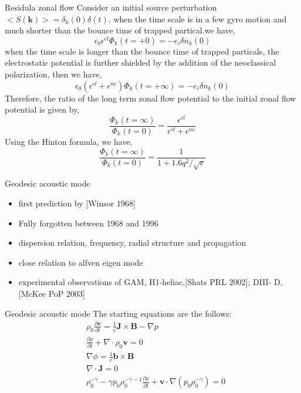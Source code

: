 \documentclass{beamer}
\begin{document}
\begin{frame}{Residula zonal flow}
Consider an initial source perturbation $<S(\pmb{k})>=\delta_k(0)\delta(t)$. when the time scale is in a few gyro motion and much shorter than the bounce time of trapped partical.we have,
\begin{equation}
\epsilon_0\epsilon^{cl}\Phi_k(t=+0)=-e_i\delta{n_k(0)}
\end{equation} 
when the time scale is longer than the bounce time of trapped particals, the electrostatic potential is further shielded by the addition of the neoclassical polarization, then we have,
\begin{equation}
\epsilon_0(\epsilon^{cl}+\epsilon^{nc})\Phi_k(t=+\infty)=-e_i\delta{n_k(0)}
\end{equation}
Therefore, the ratio of the long term zonal flow potential to the initial zonal flow potential is given by, 
\begin{equation}
\frac{\Phi_k(t=\infty)}{\Phi_k(t=0)}=\frac{\epsilon^{cl}}{\epsilon^{cl}+\epsilon^{nc}}
\end{equation}
Using the Hinton formula, we have,
\begin{equation}
\frac{\Phi_k(t=\infty)}{\Phi_k(t=0)}=\frac{1}{1+1.6q^2/\sqrt{\epsilon}}
\end{equation}
\end{frame}


\begin{frame}{Geodesic acoustic mode}
\begin{itemize}
\item first prediction by [Winsor 1968]
\item Fully forgotten between 1968 and 1996
\item dispersion relation, frequency, radial structure and propagation
\item close relation to alfven eigen mode
\item experimental observations of GAM, H1-heliac,[Shats PRL 2002]; DIII-
D, [McKee PoP 2003]
\end{itemize}
\end{frame}

\begin{frame}{Geodesic acoustic mode}
The starting equations are the follows:
\begin{equation}
\begin{aligned}
&\rho_0\frac{\partial{\pmb{v}}}{\partial{t}}=\frac{1}{c}\pmb{J}\times\pmb{B}-\nabla{p}	\\
&\frac{\partial\rho}{\partial{t}}+\nabla\cdot\rho_0\pmb{v}=0	\\
&\nabla\phi=\frac{1}{c}\pmb{b}\times\pmb{B}	\\
&\nabla\cdot\pmb{J}=0	\\
&\rho_0^{-\gamma}-\gamma{p_0}\rho_0^{-\gamma-1}\frac{\partial{\rho}}{\partial{t}}+\pmb{v}\cdot\nabla({p_0}\rho_0^{-\gamma})=0
\end{aligned}
\end{equation}	
\end{frame}
\end{document}
